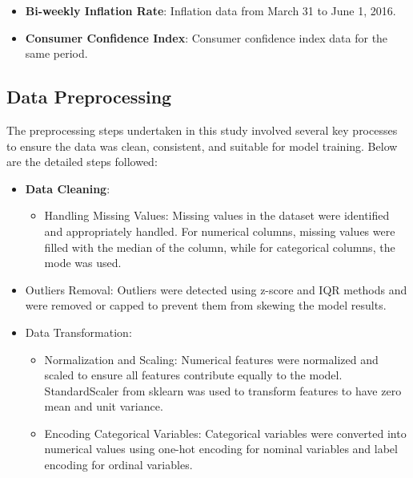 \documentclass[letterpaper, 10 pt, conference]{ieeeconf}  %
\begin{document}
\begin{itemize}
        \item \textbf{Bi-weekly Inflation Rate}: Inflation data from March 31 to June 1, 2016.
        \item \textbf{Consumer Confidence Index}: Consumer confidence index data for the same period.
\end{itemize}

\subsection{Data Preprocessing}
The preprocessing steps undertaken in this study involved several key processes to ensure the data was clean, consistent, and suitable for model training. Below are the detailed steps followed:
\begin{itemize}                
        \item \textbf{Data Cleaning}: 
        \begin{itemize}
                \item Handling Missing Values: Missing values in the dataset were identified and appropriately handled. For numerical columns, missing values were filled with the median of the column, while for categorical columns, the mode was used.        
        \end{itemize}
        \item Outliers Removal: Outliers were detected using z-score and IQR methods and were removed or capped to prevent them from skewing the model results.
        
        \item Data Transformation:
        \begin{itemize}
                \item Normalization and Scaling: Numerical features were normalized and scaled to ensure all features contribute equally to the model. StandardScaler from sklearn was used to transform features to have zero mean and unit variance.
                \item Encoding Categorical Variables: Categorical variables were converted into numerical values using one-hot encoding for nominal variables and label encoding for ordinal variables.
        \end{itemize}
        

\end{itemize}
\end{document}
